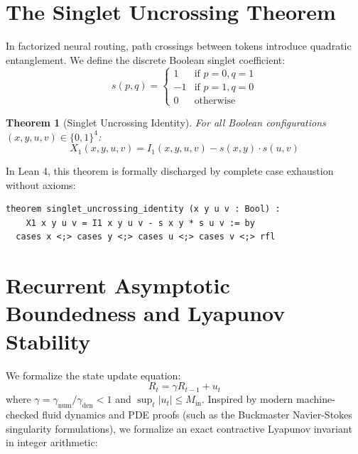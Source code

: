 \documentclass[11pt,a4paper]{article}
\newtheorem{theorem}{Theorem}
\theoremstyle{definition}
\begin{document}
\section{The Singlet Uncrossing Theorem}
In factorized neural routing, path crossings between tokens introduce quadratic entanglement. We define the discrete Boolean singlet coefficient:
\begin{equation}
s(p, q) = \begin{cases} 1 & \text{if } p = 0, q = 1 \\ -1 & \text{if } p = 1, q = 0 \\ 0 & \text{otherwise} \end{cases}
\end{equation}
\begin{theorem}[Singlet Uncrossing Identity]
For all Boolean configurations $(x, y, u, v) \in \{0, 1\}^4$:
\begin{equation}
X_1(x, y, u, v) = I_1(x, y, u, v) - s(x, y) \cdot s(u, v)
\end{equation}
\end{theorem}
In Lean 4, this theorem is formally discharged by complete case exhaustion without axioms:
\begin{verbatim}
theorem singlet_uncrossing_identity (x y u v : Bool) :
    X1 x y u v = I1 x y u v - s x y * s u v := by
  cases x <;> cases y <;> cases u <;> cases v <;> rfl
\end{verbatim}

\section{Recurrent Asymptotic Boundedness and Lyapunov Stability}
We formalize the state update equation:
\begin{equation}
R_t = \gamma R_{t-1} + u_t
\end{equation}
where $\gamma = \gamma_{\text{num}} / \gamma_{\text{den}} < 1$ and $\sup_t |u_t| \le M_{\text{in}}$. Inspired by modern machine-checked fluid dynamics and PDE proofs (such as the Buckmaster Navier-Stokes singularity formulations), we formalize an exact contractive Lyapunov invariant in integer arithmetic:
\end{document}
